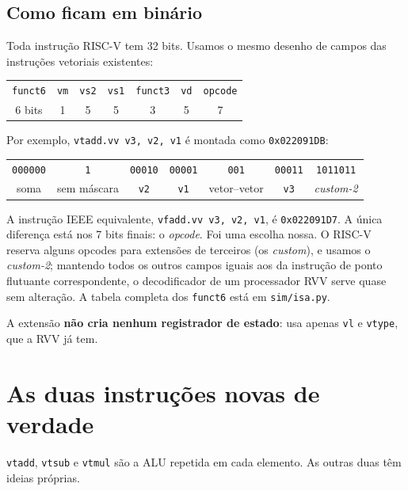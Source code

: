 \documentclass[11pt,a4paper]{article}
\newcommand{\code}[1]{\texttt{#1}}
\begin{document}
\subsection{Como ficam em binário}

Toda instrução RISC-V tem 32 bits. Usamos o mesmo desenho de campos das instruções vetoriais existentes:

\begin{center}
\small
\begin{tabular}{|c|c|c|c|c|c|c|}
\hline
\code{funct6} & \code{vm} & \code{vs2} & \code{vs1} & \code{funct3} & \code{vd} & \code{opcode}\\
6 bits & 1 & 5 & 5 & 3 & 5 & 7\\
\hline
\end{tabular}
\end{center}

Por exemplo, \code{vtadd.vv v3, v2, v1} é montada como \code{0x022091DB}:

\begin{center}
\small
\begin{tabular}{|c|c|c|c|c|c|c|}
\hline
\code{000000} & \code{1} & \code{00010} & \code{00001} & \code{001} & \code{00011} & \code{1011011}\\
soma & sem máscara & \code{v2} & \code{v1} & vetor--vetor & \code{v3} & \emph{custom-2}\\
\hline
\end{tabular}
\end{center}

A instrução IEEE equivalente, \code{vfadd.vv v3, v2, v1}, é \code{0x022091D7}. A única diferença está nos
7 bits finais: o \emph{opcode}. Foi uma escolha nossa. O RISC-V reserva alguns opcodes para extensões de
terceiros (os \emph{custom}), e usamos o \emph{custom-2}; mantendo todos os outros campos iguais aos da
instrução de ponto flutuante correspondente, o decodificador de um processador RVV serve quase sem
alteração. A tabela completa dos \code{funct6} está em \code{sim/isa.py}.

A extensão \textbf{não cria nenhum registrador de estado}: usa apenas \code{vl} e \code{vtype}, que a RVV
já tem.

\section{As duas instruções novas de verdade}

\code{vtadd}, \code{vtsub} e \code{vtmul} são a ALU repetida em cada elemento. As outras duas têm ideias
próprias.
\end{document}
